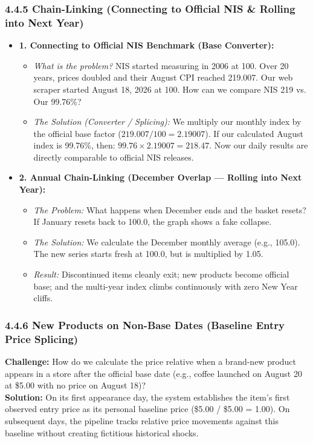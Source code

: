 \documentclass[10pt,a4paper]{article}
\begin{document}
\subsubsection*{4.4.5 Chain-Linking (Connecting to Official NIS \& Rolling into Next Year)}
\begin{itemize}[noitemsep,topsep=1pt,leftmargin=*]
    \item \textbf{1. Connecting to Official NIS Benchmark (Base Converter):}
    \begin{itemize}[noitemsep]
        \item \textit{What is the problem?} NIS started measuring in 2006 at 100. Over 20 years, prices doubled and their August CPI reached 219.007. Our web scraper started August 18, 2026 at 100. How can we compare NIS 219 vs. Our 99.76\%?
        \item \textit{The Solution (Converter / Splicing):} We multiply our monthly index by the official base factor ($219.007 / 100 = 2.19007$). If our calculated August index is 99.76\%, then: $99.76 \times 2.19007 = 218.47$. Now our daily results are directly comparable to official NIS releases.
    \end{itemize}
    \item \textbf{2. Annual Chain-Linking (December Overlap --- Rolling into Next Year):}
    \begin{itemize}[noitemsep]
        \item \textit{The Problem:} What happens when December ends and the basket resets? If January resets back to 100.0, the graph shows a fake collapse.
        \item \textit{The Solution:} We calculate the December monthly average (e.g., 105.0). The new series starts fresh at 100.0, but is multiplied by 1.05.
        \item \textit{Result:} Discontinued items cleanly exit; new products become official base; and the multi-year index climbs continuously with zero New Year cliffs.
    \end{itemize}
\end{itemize}

\subsubsection*{4.4.6 New Products on Non-Base Dates (Baseline Entry Price Splicing)}
\noindent
\textbf{Challenge:} How do we calculate the price relative when a brand-new product appears in a store after the official base date (e.g., coffee launched on August 20 at \$5.00 with no price on August 18)?\\
\textbf{Solution:} On its first appearance day, the system establishes the item's first observed entry price as its personal baseline price (\$5.00 / \$5.00 = 1.00). On subsequent days, the pipeline tracks relative price movements against this baseline without creating fictitious historical shocks.
\end{document}
